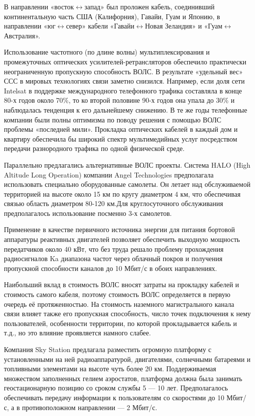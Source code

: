 \documentclass[14pt,a4paper,oneside]{extarticle}
\begin{document}
В направлении «восток$\longleftrightarrow$запад» был проложен кабель, соединивший континентальную часть США (Калифорния), Гавайи, Гуам и  Японию, в направлении «юг$\longleftrightarrow$север» кабели «Гавайи$\longleftrightarrow$Новая Зеландия» и «Гуам$\longleftrightarrow$Австралия».

Использование частотного (по длине волны) мультиплексирования  и промежуточных оптических усилителей-ретрансляторов обеспечило практически неограниченную пропускную способность ВОЛС.
В результате «удельный вес» ССС в мировых технологиях связи заметно снизился. Например, если доля сети Intelsat в поддержке международного телефонного трафика составляла в конце 80-х годов около 70\%, то ко второй половине 90-х годов она упала до 30\% и наблюдалась тенденция к его дальнейшему снижению.
В те же годы телефонные компании были полны оптимизма по поводу решения с помощью ВОЛС проблемы «последней мили».
Прокладка оптических кабелей в каждый дом и квартиру обеспечила бы широкий спектр мультимедийных услуг посредством передачи разнородного трафика по одной физической среде.

Параллельно предлагались альтернативные ВОЛС проекты. Система HALO (High Altitude Long Operation) компании Angel Technologies предполагала использовать специально оборудованные самолеты. Он летает над обслуживаемой территорией на высоте около 15 км по кругу диаметром 4 км, что обеспечивая связью область диаметром 80-120 км.Для круглосуточного обслуживания предполагалось использование посменно 3-х самолетов.

Применение в качестве первичного источника энергии для питания бортовой аппаратуры реактивных двигателей позволяет обеспечить выходную мощность передатчиков около 40 кВт, что без труда решало проблему прохождения радиосигналов Ka диапазона частот через облачный покров и получения пропускной способности каналов до 10 Мбит/с в обоих направлениях.

Наибольший вклад в стоимость ВОЛС вносят затраты на прокладку кабелей и стоимость самого кабеля, поэтому стоимость ВОЛС определяется в первую очередь её протяженностью.
На стоимость наземного магистрального канала  связи влияет также его пропускная способность, число точек подключения к нему пользователей, особенности территории, по которой прокладывается кабель и т.д., но это влияние проявляется намного слабее.

Компания Sky Station предлагала разместить огромную платформу с установленными на ней радиоаппаратурой, двигателями, солнечными батареями и топливными элементами на высоте чуть более 20 км. Поддерживаемая множеством заполненных гелием аэростатов,  платформа должна была занимать геостационарную позицию со сроком службы 5 — 10 лет. Предполагалось обеспечивать передачу информации к пользователям со скоростями до 10 Мбит/с, а в противоположном направлении — 2 Мбит/с.
\end{document}

